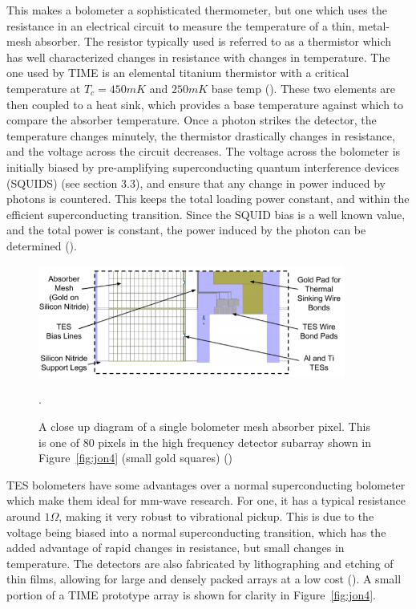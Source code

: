\documentclass[manuscript]{aastex}
\begin{document}
This makes a bolometer a sophisticated thermometer, but one which uses the resistance in an electrical circuit to measure the temperature of a thin, metal-mesh absorber. The resistor typically used is referred to as a thermistor which has well characterized changes in resistance with changes in temperature. The one used by TIME is an elemental titanium thermistor with a critical temperature at \(T_{c} = 450 mK\) and \(250 mK\) base temp (\cite{Crites2014}). These two elements are then coupled to a heat sink, which provides a base temperature against which to compare the absorber temperature. Once a photon strikes the detector, the temperature changes minutely, the thermistor drastically changes in resistance, and the voltage across the circuit decreases. The voltage across the bolometer is initially biased by pre-amplifying superconducting quantum interference devices (SQUIDS) (see section 3.3), and ensure that any change in power induced by photons is countered. This keeps the total loading power constant, and within the efficient superconducting transition. Since the SQUID bias is a well known value, and the total power is constant, the power induced by the photon can be determined (\cite{O'Brient2010}).

\begin{figure}[H]
\centering
\captionsetup{width=0.9\textwidth}
\includegraphics[width=0.9\textwidth]{jon5.PNG}
\caption[Single TES Detector Pixel -(\cite{Hunacek2016b})]{A close up diagram of a single bolometer mesh absorber pixel. This is one of 80 pixels in the high frequency detector subarray shown in Figure~\ref{fig:jon4} (small gold squares) (\cite{Hunacek2016b})}. 
\label{fig:jon5}
\vspace{-0.8cm}
\end{figure}

TES bolometers have some advantages over a normal superconducting bolometer which make them ideal for mm-wave research. For one, it has a typical resistance around \(1\Omega\), making it very robust to vibrational pickup. This is due to the voltage being biased into a normal superconducting transition, which has the added advantage of rapid changes in resistance, but small changes in temperature. The detectors are also fabricated by lithographing and etching of thin films, allowing for large and densely packed arrays at a low cost (\cite{O'Brient2010}). A small portion of a TIME prototype array is shown for clarity in Figure~\ref{fig:jon4}.
\end{document}
